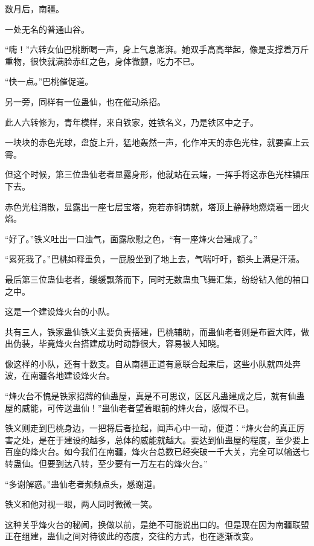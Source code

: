
\begin{this_body}



数月后，南疆。

一处无名的普通山谷。

“嗨！”六转女仙巴桃断喝一声，身上气息澎湃。她双手高高举起，像是支撑着万斤重物，很快就满脸赤红之色，身体微颤，吃力不已。

“快一点。”巴桃催促道。

另一旁，同样有一位蛊仙，也在催动杀招。

此人六转修为，青年模样，来自铁家，姓铁名义，乃是铁区中之子。

一块块的赤色光球，盘旋上升，猛地轰然一声，化作冲天的赤色光柱，就要直上云霄。

但这个时候，第三位蛊仙老者显露身形，他就站在云端，一挥手将这赤色光柱镇压下去。

赤色光柱消散，显露出一座七层宝塔，宛若赤铜铸就，塔顶上静静地燃烧着一团火焰。

“好了。”铁义吐出一口浊气，面露欣慰之色，“有一座烽火台建成了。”

“累死我了。”巴桃如释重负，一屁股坐到了地上去，气喘吁吁，额头上满是汗渍。

最后第三位蛊仙老者，缓缓飘落而下，同时无数蛊虫飞舞汇集，纷纷钻入他的袖口之中。

这是一个建设烽火台的小队。

共有三人，铁家蛊仙铁义主要负责搭建，巴桃辅助，而蛊仙老者则是布置大阵，做出伪装，毕竟烽火台搭建成功时动静很大，容易被人知晓。

像这样的小队，还有十数支。自从南疆正道有意联合起来后，这些小队就四处奔波，在南疆各地建设烽火台。

“烽火台不愧是铁家招牌的仙蛊屋，真是不可思议，区区凡蛊建成之后，就有仙蛊屋的威能，可传送蛊仙！”蛊仙老者望着眼前的烽火台，感慨不已。

铁义则走到巴桃身边，一把将后者拉起，闻声心中一动，便道：“烽火台的真正厉害之处，是在于建设的越多，总体的威能就越大。要达到仙蛊屋的程度，至少要上百座的烽火台。如今我们在南疆，烽火台总数已经突破一千大关，完全可以输送七转蛊仙。但要到达八转，至少要有一万左右的烽火台。”

“多谢解惑。”蛊仙老者频频点头，感谢道。

铁义和他对视一眼，两人同时微微一笑。

这种关乎烽火台的秘闻，换做以前，是绝不可能说出口的。但是现在因为南疆联盟正在组建，蛊仙之间对待彼此的态度，交往的方式，也在逐渐改变。


\end{this_body}
